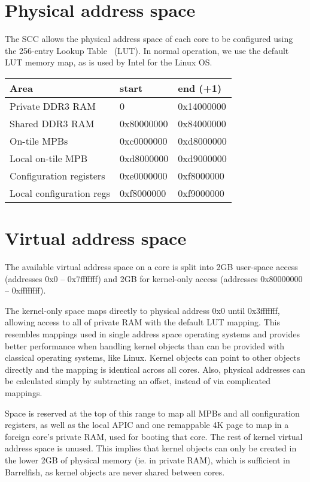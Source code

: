 \documentclass[a4paper,twoside]{report} %
\begin{document}
\section{Physical address space}

The SCC allows the physical address space of each core to be
configured using the 256-entry Lookup Table~\cite{rockcreek_eas}
(LUT).  In normal operation, we use the default LUT memory map, as is
used by Intel for the Linux OS.

\begin{center}
\begin{tabular}{lll}
Area & start & end (+1)\\
\hline
Private DDR3 RAM & 0 & 0x14000000 \\
Shared DDR3 RAM & 0x80000000 &0x84000000 \\
On-tile MPBs & 0xc0000000 & 0xd8000000 \\
Local on-tile MPB & 0xd8000000 & 0xd9000000 \\
Configuration registers & 0xe0000000 & 0xf8000000 \\
Local configuration regs & 0xf8000000 & 0xf9000000 \\
\end{tabular}
\end{center}

\section{Virtual address space}

The available virtual address space on a core is split into 2GB
user-space access (addresses 0x0 -- 0x7fffffff) and 2GB for
kernel-only access (addresses 0x80000000 -- 0xffffffff).

The kernel-only space maps directly to physical address 0x0 until
0x3fffffff, allowing access to all of private RAM with the default LUT
mapping. This resembles mappings used in single address space
operating systems and provides better performance when handling kernel
objects than can be provided with classical operating systems, like
Linux. Kernel objects can point to other objects directly and the
mapping is identical across all cores. Also, physical addresses can be
calculated simply by subtracting an offset, instead of via complicated
mappings.

Space is reserved at the top of this range to map all MPBs and all
configuration registers, as well as the local APIC and one remappable
4K page to map in a foreign core's private RAM, used for booting that
core.  The rest of kernel virtual address space is unused. This
implies that kernel objects can only be created in the lower 2GB of
physical memory (ie. in private RAM), which is sufficient in
Barrelfish, as kernel objects are never shared between cores.
\end{document}
